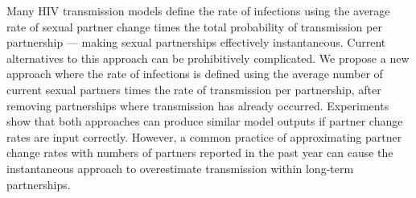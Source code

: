 Many HIV transmission models define the rate of infections using
the average rate of sexual partner change times
the total probability of transmission per partnership
--- making sexual partnerships effectively instantaneous.
Current alternatives to this approach can be prohibitively complicated.
We propose a new approach where the rate of infections is defined using
the average number of current sexual partners times
the rate of transmission per partnership,
after removing partnerships where transmission has already occurred.
Experiments show that both approaches can produce similar model outputs
if partner change rates are input correctly.
However, a common practice of approximating partner change rates
with numbers of partners reported in the past year
can cause the instantaneous approach to overestimate
transmission within long-term partnerships.
